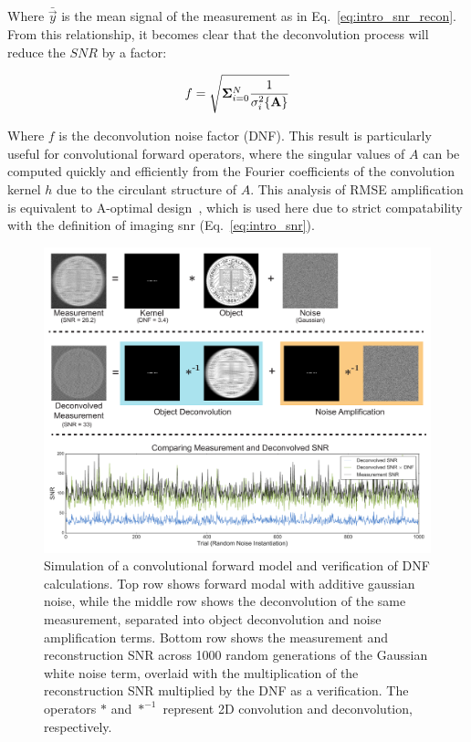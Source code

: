 Where $\bar{\vec{y}}$ is the mean signal of the measurement as in Eq.~\ref{eq:intro_snr_recon}. From this relationship, it becomes clear that the deconvolution process will reduce the $SNR$ by a factor:

\begin{equation}\label{eq:intro_dnf}
    f = \sqrt{\mathbf{\Sigma}_{i=0}^N{\frac{1}{\sigma_i^2\{\mathbf{A}\}}}}
\end{equation}

Where $f$ is the deconvolution noise factor (DNF). This result is particularly useful for convolutional forward operators, where the singular values of $A$ can be computed quickly and efficiently from the Fourier coefficients of the convolution kernel $h$ due to the circulant structure of $A$. This analysis of RMSE amplification is equivalent to A-optimal design~\cite{chernoff1953locally}, which is used here due to strict compatability with the definition of imaging snr (Eq.~\ref{eq:intro_snr}).

\begin{figure}[tbh]
\centering
\includegraphics[width=\textwidth]{figures/fig_intro_dnf.pdf}
\caption{\label{fig:intro:dnf} Simulation of a convolutional forward model and verification of DNF calculations. Top row shows forward modal with additive gaussian noise, while the middle row shows the deconvolution of the same measurement, separated into object deconvolution and noise amplification terms. Bottom row shows the measurement and reconstruction SNR across 1000 random generations of the Gaussian white noise term, overlaid with the multiplication of the reconstruction SNR multiplied by the DNF as a verification. The operators $*$ and $*^{-1}$ represent 2D convolution and deconvolution, respectively.}
\end{figure}

